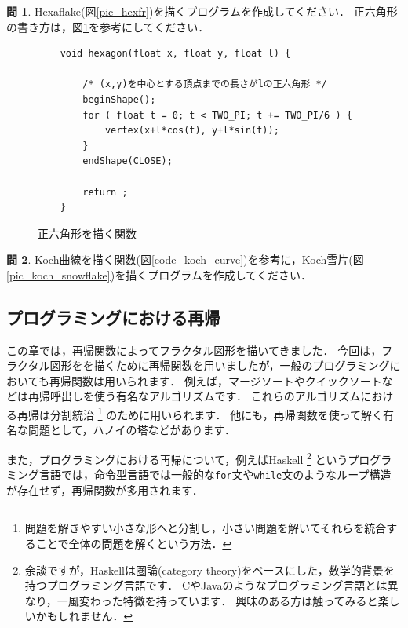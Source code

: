 \documentclass[dvipdfmx]{jsarticle}
\theoremstyle{definition}
\newtheorem{question}{問}[section]
\begin{document}
\begin{question}
    Hexaflake(図\ref{pic_hexfr})を描くプログラムを作成してください．
    正六角形の書き方は，図\ref{code_hexfunc}を参考にしてください．
\begin{figure}[ht]
\begin{center}
\footnotesize
\begin{oframed}
\begin{verbatim}
    void hexagon(float x, float y, float l) {

        /* (x,y)を中心とする頂点までの長さがlの正六角形 */
        beginShape();
        for ( float t = 0; t < TWO_PI; t += TWO_PI/6 ) {
            vertex(x+l*cos(t), y+l*sin(t));
        }
        endShape(CLOSE);

        return ;
    }
\end{verbatim}
\end{oframed}
\end{center}
\caption{正六角形を描く関数}
\label{code_hexfunc}
\end{figure}
\end{question}

\begin{question}
    Koch曲線を描く関数(図\ref{code_koch_curve})を参考に，Koch雪片(図\ref{pic_koch_snowflake})を描くプログラムを作成してください．
\end{question}


\subsection{プログラミングにおける再帰}

この章では，再帰関数によってフラクタル図形を描いてきました．
今回は，フラクタル図形をを描くために再帰関数を用いましたが，一般のプログラミングにおいても再帰関数は用いられます．
例えば，マージソートやクイックソートなどは再帰呼出しを使う有名なアルゴリズムです．
これらのアルゴリズムにおける再帰は分割統治
\footnote{問題を解きやすい小さな形へと分割し，小さい問題を解いてそれらを統合することで全体の問題を解くという方法．}
のために用いられます．
他にも，再帰関数を使って解く有名な問題として，ハノイの塔などがあります．

また，プログラミングにおける再帰について，例えばHaskell
\footnote{
    余談ですが，Haskellは圏論(category theory)をベースにした，数学的背景を持つプログラミング言語です．
    CやJavaのようなプログラミング言語とは異なり，一風変わった特徴を持っています．
    興味のある方は触ってみると楽しいかもしれません．
}
というプログラミング言語では，命令型言語では一般的な\verb|for|文や\verb|while|文のようなループ構造が存在せず，再帰関数が多用されます．
\end{document}
